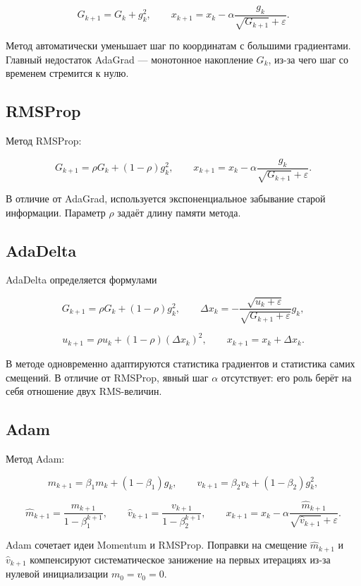 \documentclass[a4paper,12pt]{article}
\newcommand{\eps}{\varepsilon}
\begin{document}
\[
G_{k+1}=G_k+g_k^2,
\qquad
x_{k+1}
=
x_k
-
\alpha
\frac{g_k}{\sqrt{G_{k+1}}+\eps}.
\]

Метод автоматически уменьшает шаг
по координатам с большими градиентами.
Главный недостаток AdaGrad —
монотонное накопление $G_k$,
из-за чего шаг со временем стремится к нулю.

\subsection{RMSProp}

Метод RMSProp:

\[
G_{k+1}
=
\rho G_k
+
(1-\rho)g_k^2,
\qquad
x_{k+1}
=
x_k
-
\alpha
\frac{g_k}{\sqrt{G_{k+1}}+\eps}.
\]

В отличие от AdaGrad,
используется экспоненциальное забывание старой информации.
Параметр $\rho$ задаёт длину памяти метода.

\subsection{AdaDelta}

AdaDelta определяется формулами

\[
G_{k+1}
=
\rho G_k+(1-\rho)g_k^2,
\qquad
\Delta x_k
=
-
\frac{\sqrt{u_k+\eps}}
{\sqrt{G_{k+1}+\eps}}
g_k,
\]

\[
u_{k+1}
=
\rho u_k
+
(1-\rho)(\Delta x_k)^2,
\qquad
x_{k+1}=x_k+\Delta x_k.
\]

В методе одновременно адаптируются статистика градиентов
и статистика самих смещений.
В отличие от RMSProp, явный шаг $\alpha$ отсутствует:
его роль берёт на себя отношение двух RMS-величин.

\subsection{Adam}

Метод Adam:

\[
m_{k+1}
=
\beta_1m_k+(1-\beta_1)g_k,
\qquad
v_{k+1}
=
\beta_2v_k+(1-\beta_2)g_k^2,
\]

\[
\hat m_{k+1}
=
\frac{m_{k+1}}{1-\beta_1^{k+1}},
\qquad
\hat v_{k+1}
=
\frac{v_{k+1}}{1-\beta_2^{k+1}},
\qquad
x_{k+1}
=
x_k
-
\alpha
\frac{\hat m_{k+1}}
{\sqrt{\hat v_{k+1}}+\eps}.
\]

Adam сочетает идеи Momentum и RMSProp.
Поправки на смещение $\hat m_{k+1}$ и $\hat v_{k+1}$
компенсируют систематическое занижение на первых итерациях
из-за нулевой инициализации $m_0=v_0=0$.
\end{document}
